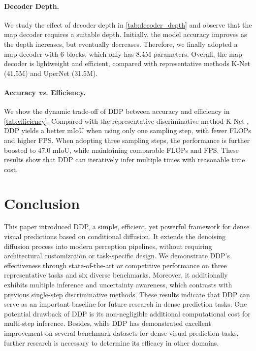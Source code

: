 \documentclass[10pt,twocolumn,letterpaper]{article}
\newcommand{\ours}[0]{DDP\xspace}
\begin{document}
\paragraph{Decoder Depth.}
We study the effect of decoder depth in \cref{tab:decoder_depth} and observe that the map decoder requires a suitable depth.
Initially, the model accuracy improves as the depth increases, but eventually decreases. 
Therefore, we finally adopted a map decoder with 6 blocks, which only has 8.4M parameters.
Overall, the map decoder is lightweight and efficient, compared with representative methods K-Net \cite{zhang2021k} (41.5M) and UperNet \cite{xiao2018unified} (31.5M).




\paragraph{Accuracy \emph{vs.} Efficiency.}

We show the dynamic trade-off of \ours between accuracy and efficiency  in \cref{tab:efficiency}. 
Compared with the representative discriminative method K-Net \cite{zhang2021k}, \ours yields a better mIoU when using only one sampling step, with fewer FLOPs and higher FPS. When adopting three sampling steps, the performance is further boosted to 47.0 mIoU, while maintaining comparable FLOPs and FPS.
These results show that \ours can iteratively infer multiple times with reasonable time cost.
 \vspace{0.7em}
\section{Conclusion}
This paper introduced DDP, a simple, efficient, yet powerful framework for dense visual predictions based on conditional diffusion.
It extends the denoising diffusion process into modern perception pipelines, without requiring architectural customization or task-specific design.
We demonstrate DDP's effectiveness through state-of-the-art or competitive performance on three representative tasks and six diverse benchmarks.
Moreover, it additionally exhibits multiple inference and uncertainty awareness, which contrasts with previous single-step discriminative methods. 
These results indicate that DDP can serve as an important baseline for future research in dense prediction tasks.
One potential drawback of DDP is its non-negligible additional computational cost for multi-step inference. 
Besides, while DDP has demonstrated excellent improvement on several benchmark datasets for dense visual prediction tasks, further research is necessary to determine its efficacy in other domains.
\end{document}
